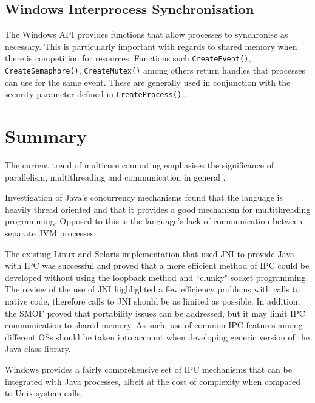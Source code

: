 \documentclass[12pt,a4paper,oneside]{article}
\def\code#1{\texttt{#1}}
\begin{document}
\begin{spacing}{1.4}
\subsection{Windows Interprocess Synchronisation}
The Windows API provides functions that allow processes to synchronise as necessary. This is particularly important with regards to shared memory when there is competition for resources. Functions such \code{CreateEvent()}, \code{CreateSemaphore()}, \code{CreateMutex()} among others return handles that processes can use for the same event. These are generally used in conjunction with the security parameter defined in \code{CreateProcess()} \citep{MSDN_API}.
\end{spacing}

\section{Summary}
\begin{spacing}{1.4}
The current trend of multicore computing emphasises the significance of parallelism, multithreading and communication in general \citep{taboada2013javaforHPC}. 

Investigation of Java's concurrency mechanisms found that the language is heavily thread oriented and that it provides a good mechanism for multithreading programming. Opposed to this is the language's lack of communication between separate JVM processes. 

The existing Linux and Solaris implementation that used JNI to provide Java with IPC was successful and proved that a more efficient method of IPC could be developed without using the loopback method and ``clunky" socket programming. The review of the use of JNI highlighted a few efficiency problems with calls to native code, therefore calls to JNI should be as limited as possible. In addition, the SMOF proved that portability issues can be addressed, but it may limit IPC communication to shared memory. As such, use of common IPC features among different OSs should be taken into account when developing generic version of the Java class library.

Windows provides a fairly comprehensive set of IPC mechanisms that can be integrated with Java processes, albeit at the cost of complexity when compared to Unix system calls. 
\end{spacing}
\pagebreak
  

  
\end{document}
